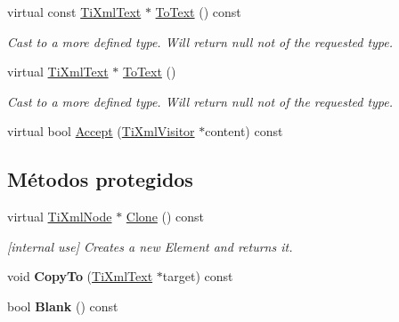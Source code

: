 \begin{DoxyCompactItemize}
\item 
\hypertarget{classTiXmlText_a895bf34ffad17f7439ab2a52b9651648}{virtual const \hyperlink{classTiXmlText}{\-Ti\-Xml\-Text} $\ast$ \hyperlink{classTiXmlText_a895bf34ffad17f7439ab2a52b9651648}{\-To\-Text} () const }\label{classTiXmlText_a895bf34ffad17f7439ab2a52b9651648}

\begin{DoxyCompactList}\small\item\em \-Cast to a more defined type. \-Will return null not of the requested type. \end{DoxyCompactList}\item 
\hypertarget{classTiXmlText_ae7c3a8fd3e4dbf6c0c4363a943d72f5b}{virtual \hyperlink{classTiXmlText}{\-Ti\-Xml\-Text} $\ast$ \hyperlink{classTiXmlText_ae7c3a8fd3e4dbf6c0c4363a943d72f5b}{\-To\-Text} ()}\label{classTiXmlText_ae7c3a8fd3e4dbf6c0c4363a943d72f5b}

\begin{DoxyCompactList}\small\item\em \-Cast to a more defined type. \-Will return null not of the requested type. \end{DoxyCompactList}\item 
virtual bool \hyperlink{classTiXmlText_a43b9954ebf679557fac1a4453f337b7c}{\-Accept} (\hyperlink{classTiXmlVisitor}{\-Ti\-Xml\-Visitor} $\ast$content) const 
\end{DoxyCompactItemize}
\subsection*{\-Métodos protegidos}
\begin{DoxyCompactItemize}
\item 
\hypertarget{classTiXmlText_adde1869dfb029be50713fbfd8ce4d21f}{virtual \hyperlink{classTiXmlNode}{\-Ti\-Xml\-Node} $\ast$ \hyperlink{classTiXmlText_adde1869dfb029be50713fbfd8ce4d21f}{\-Clone} () const }\label{classTiXmlText_adde1869dfb029be50713fbfd8ce4d21f}

\begin{DoxyCompactList}\small\item\em \mbox{[}internal use\mbox{]} \-Creates a new \-Element and returns it. \end{DoxyCompactList}\item 
\hypertarget{classTiXmlText_adcec7d9b6fccfc5777452bb97e6031c1}{void {\bfseries \-Copy\-To} (\hyperlink{classTiXmlText}{\-Ti\-Xml\-Text} $\ast$target) const }\label{classTiXmlText_adcec7d9b6fccfc5777452bb97e6031c1}

\item 
\hypertarget{classTiXmlText_a1c120428e3b3cf24d79706e6d2b65aa6}{bool {\bfseries \-Blank} () const }\label{classTiXmlText_a1c120428e3b3cf24d79706e6d2b65aa6}

\end{DoxyCompactItemize}
